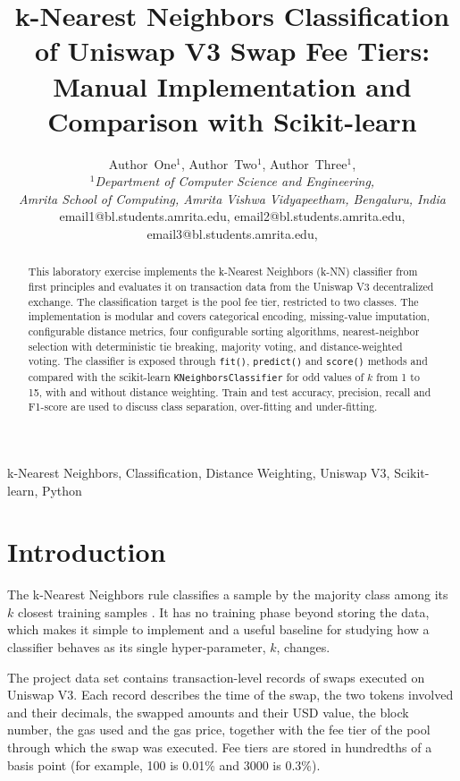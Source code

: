 \documentclass[conference]{IEEEtran}
\title{k-Nearest Neighbors Classification of Uniswap V3 Swap Fee Tiers: Manual Implementation and Comparison with Scikit-learn}
\author{%
  \parbox{\textwidth}{\centering
    \fontsize{9}{10}\selectfont
    Author~One$^{1}$,\;
    Author~Two$^{1}$,\;
    Author~Three$^{1}$,\\[4pt]
    \textit{$^{1}$Department of Computer Science and Engineering,}\\
    \textit{Amrita School of Computing, Amrita Vishwa Vidyapeetham, Bengaluru, India}\\[4pt]
    \footnotesize
    email1@bl.students.amrita.edu,\;
    email2@bl.students.amrita.edu,\;
    email3@bl.students.amrita.edu,\\
  }
}
\begin{document}
\maketitle
\begin{abstract}

This laboratory exercise implements the k-Nearest Neighbors (k-NN) classifier from first principles and evaluates it on transaction data from the Uniswap V3 decentralized exchange. The classification target is the pool fee tier, restricted to two classes. The implementation is modular and covers categorical encoding, missing-value imputation, configurable distance metrics, four configurable sorting algorithms, nearest-neighbor selection with deterministic tie breaking, majority voting, and distance-weighted voting. The classifier is exposed through \texttt{fit()}, \texttt{predict()} and \texttt{score()} methods and compared with the scikit-learn \texttt{KNeighborsClassifier} for odd values of $k$ from 1 to 15, with and without distance weighting. Train and test accuracy, precision, recall and F1-score are used to discuss class separation, over-fitting and under-fitting.

\end{abstract}

\begin{IEEEkeywords}

k-Nearest Neighbors,
Classification,
Distance Weighting,
Uniswap V3,
Scikit-learn,
Python

\end{IEEEkeywords}


\section{Introduction}

The k-Nearest Neighbors rule classifies a sample by the majority class among its $k$ closest training samples \cite{cover1967}. It has no training phase beyond storing the data, which makes it simple to implement and a useful baseline for studying how a classifier behaves as its single hyper-parameter, $k$, changes.

The project data set contains transaction-level records of swaps executed on Uniswap V3. Each record describes the time of the swap, the two tokens involved and their decimals, the swapped amounts and their USD value, the block number, the gas used and the gas price, together with the fee tier of the pool through which the swap was executed. Fee tiers are stored in hundredths of a basis point (for example, 100 is 0.01\% and 3000 is 0.3\%).
\end{document}
